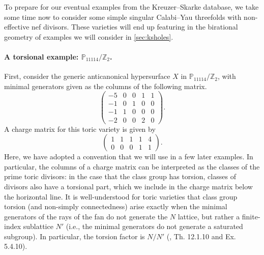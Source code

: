 \documentclass[11pt,dvipsnames]{article}
\theoremstyle{definition}
\begin{document}
To prepare for our eventual examples from the Kreuzer--Skarke database, we take some time now to consider some simple singular Calabi--Yau threefolds with non-effective nef divisors. These varieties will end up featuring in the birational geometry of examples we will consider in \cref{sec:ksholes}.

\paragraph{A torsional example: $\mathbb{P}_{11114}/\mathbb{Z}_2$.} First, consider the generic anticanonical hypersurface $X$ in $\mathbb{P}_{11114}/\mathbb{Z}_2$, with minimal generators given as the columns of the following matrix.
\begin{equation}
    \begin{pmatrix}
        -5 & 0 & 0 & 1 & 1 \\
        -1 & 0 & 1 & 0 & 0 \\
        -1 & 1 & 0 & 0 & 0 \\
        -2 & 0 & 0 & 2 & 0
    \end{pmatrix}.
\end{equation}
A charge matrix for this toric variety is given by
\begin{equation}
    \label{eq:toy_torsion_charge_matrix}
    \left(\begin{array}{cccccc}
        1 & 1 & 1 & 1 & 4 \\ \hline 0 & 0 & 0 & 1 & 1
    \end{array}\right).
\end{equation}
Here, we have adopted a convention that we will use in a few later examples. In particular, the columns of a charge matrix can be interpreted as the classes of the prime toric divisors: in the case that the class group has torsion, classes of divisors also have a torsional part, which we include in the charge matrix below the horizontal line. It is well-understood for toric varieties that class group torsion (and non-simply connectedness) arise exactly when the minimal generators of the rays of the fan do not generate the $N$ lattice, but rather a finite-index sublattice $N'$ (i.e., the minimal generators do not generate a saturated subgroup). In particular, the torsion factor is $N / N'$ (\cite{cls}, Th. 12.1.10 and Ex. 5.4.10). 
\end{document}
